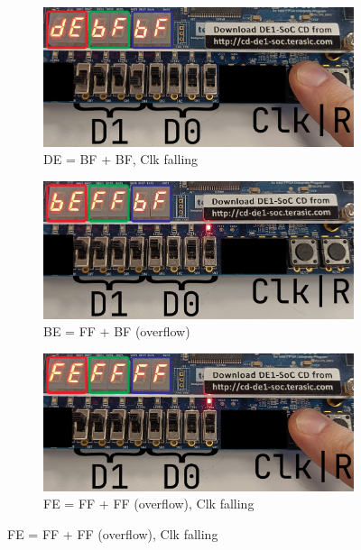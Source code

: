 \documentclass{article}
\begin{document}
\begin{figure}[h]\ContinuedFloat
    \centering
    \begin{subfigure}[t]{0.7\textwidth}
        \centering
        \includegraphics[width=1\textwidth]{Figures/Part5_5.jpg}
        \caption{DE = BF + BF, Clk falling}
        \label{fig:p5_5}
    \end{subfigure}

    \begin{subfigure}[t]{0.7\textwidth}
        \centering
        \includegraphics[width=1\textwidth]{Figures/Part5_6.jpg}
        \caption{BE = FF + BF (overflow)}
        \label{fig:p5_6}
    \end{subfigure}
    
    \begin{subfigure}[t]{0.7\textwidth}
        \centering
        \includegraphics[width=1\textwidth]{Figures/Part5_7.jpg}
        \caption{FE = FF + FF (overflow), Clk falling}
        \label{fig:p5_7}
    \end{subfigure}


\end{figure}
\end{document}
